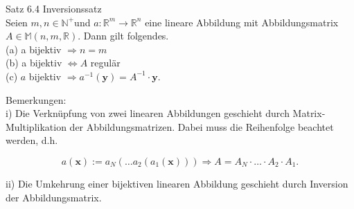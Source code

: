 \documentclass[10pt]{article}
\begin{document}
Satz 6.4 Inversionssatz\\
Seien $m, n \in \mathbb{N}^{+}$und $a: \mathbb{R}^{m} \rightarrow \mathbb{R}^{n}$ eine lineare Abbildung mit Abbildungsmatrix $A \in \mathbb{M}(n, m, \mathbb{R})$. Dann gilt folgendes.\\
(a) a bijektiv $\Rightarrow n=m$\\
(b) a bijektiv $\Leftrightarrow A$ regulär\\
(c) $a$ bijektiv $\Rightarrow a^{-1}(\mathbf{y})=A^{-1} \cdot \mathbf{y}$.

Bemerkungen:\\
i) Die Verknüpfung von zwei linearen Abbildungen geschieht durch Matrix-Multiplikation der Abbildungsmatrizen. Dabei muss die Reihenfolge beachtet werden, d.h.


\begin{equation*}
a(\mathbf{x}):=a_{N}\left(\ldots a_{2}\left(a_{1}(\mathbf{x})\right)\right) \Rightarrow A=A_{N} \cdot \ldots \cdot A_{2} \cdot A_{1} . \tag{6.41}
\end{equation*}


ii) Die Umkehrung einer bijektiven linearen Abbildung geschieht durch Inversion der Abbildungsmatrix.
\end{document}
